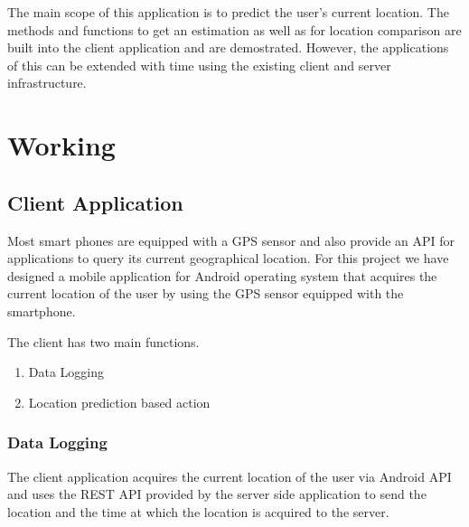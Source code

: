 \documentclass[conference]{IEEEtran}
\begin{document}
The main scope of this application is to predict the user's current location. The methods and functions to get an estimation as well as for location comparison are built into the client application and are demostrated. However, the applications of this can be extended with time using the existing client and server infrastructure.

\section{Working}

\subsection{Client Application}
Most smart phones are equipped with a GPS sensor and also provide an API for applications to query its current geographical location. For this project we have designed a mobile application for Android operating system that acquires the current location of the user by using the GPS sensor equipped with the smartphone.

The client has two main functions.
\begin{enumerate}
  \item Data Logging
  \item Location prediction based action
\end{enumerate}

\subsubsection{Data Logging}
The client application acquires the current location of the user via Android API and uses the REST API provided by the server side application to send the location and the time at which the location is acquired to the server.

\begin{table}[h!]
  \centering
  \caption{Data stored to server by the client}
  \label{tab:label_client_data}
\end{table}
\end{document}
